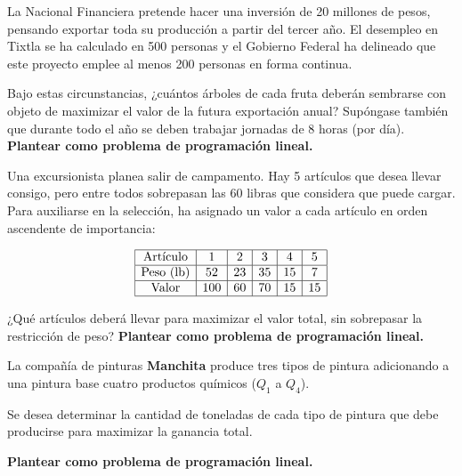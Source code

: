 \begin{Ejer}
La Nacional Financiera pretende hacer una inversi\'on de 20 millones de pesos, pensando exportar toda su producci\'on a partir del tercer a\~no. El desempleo en Tixtla se ha calculado en 500 personas y el Gobierno Federal ha delineado que este proyecto emplee al menos 200 personas en forma continua.

Bajo estas circunstancias, ¿cu\'antos \'arboles de cada fruta deber\'an sembrarse con objeto de maximizar el valor de la futura exportaci\'on anual? Sup\'ongase tambi\'en que durante todo el a\~no se deben trabajar jornadas de 8 horas (por d\'ia). \textbf{Plantear como problema de programaci\'on lineal.}
\end{Ejer}

\begin{Ejer}
Una excursionista planea salir de campamento. Hay 5 art\'iculos que desea llevar consigo, pero entre todos sobrepasan las 60 libras que considera que puede cargar. Para auxiliarse en la selecci\'on, ha asignado un valor a cada art\'iculo en orden ascendente de importancia:

\[
\begin{array}{|c|c|c|c|c|c|}
\hline
\text{Art\'iculo} & 1 & 2 & 3 & 4 & 5 \\
\hline
\text{Peso (lb)} & 52 & 23 & 35 & 15 & 7 \\
\hline
\text{Valor} & 100 & 60 & 70 & 15 & 15 \\
\hline
\end{array}
\]

¿Qu\'e art\'iculos deber\'a llevar para maximizar el valor total, sin sobrepasar la restricci\'on de peso? \textbf{Plantear como problema de programaci\'on lineal.}
\end{Ejer}

\begin{Ejer}

La compa\~n\'ia de pinturas \textbf{Manchita} produce tres tipos de pintura adicionando a una pintura base cuatro productos qu\'imicos ($Q_1$ a $Q_4$). 

Se desea determinar la cantidad de toneladas de cada tipo de pintura que debe producirse para maximizar la ganancia total.

\bigskip

\begin{center}
\end{center}
\textbf{Plantear como problema de programaci\'on lineal.}
\end{Ejer}

